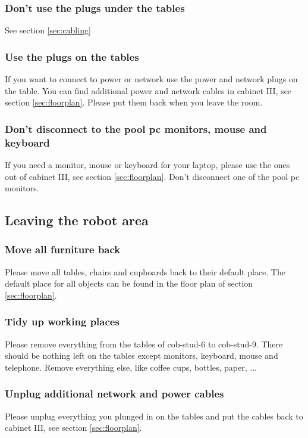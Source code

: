 \subsubsection{Don't use the plugs under the tables}
See section \ref{sec:cabling}

\subsubsection{Use the plugs on the tables}
If you want to connect to power or network use the power and network plugs on the table. You can find additional power and network cables in cabinet III, see section \ref{sec:floorplan}. Please put them back when you leave the room.

\subsubsection{Don't disconnect to the pool pc monitors, mouse and keyboard}
If you need a monitor, mouse or keyboard for your laptop, please use the ones out of cabinet III, see section \ref{sec:floorplan}. Don't disconnect one of the pool pc monitors.

\subsection{Leaving the robot area}
\subsubsection{Move all furniture back}
Please move all tables, chairs and cupboards back to their default place. The default place for all objects can be found in the floor plan of section \ref{sec:floorplan}.

\subsubsection{Tidy up working places}\label{sec:tidyup}
Please remove everything from the tables of cob-stud-6 to cob-stud-9. There should be nothing left on the tables except monitors, keyboard, mouse and telephone. Remove everything else, like coffee cups, bottles, paper, ...

\subsubsection{Unplug additional network and power cables}
Please unplug everything you plunged in on the tables and put the cables back to cabinet III, see section \ref{sec:floorplan}.

